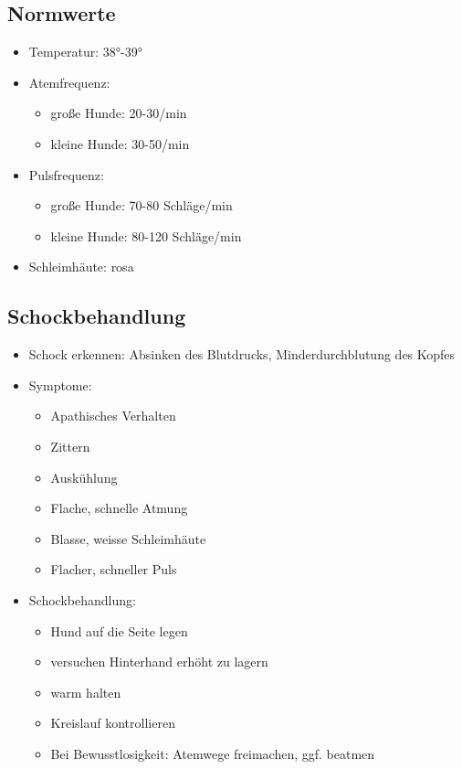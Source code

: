     \subsection{Normwerte}
    \begin{itemize}
        \item Temperatur: 38°-39°
        \item Atemfrequenz:
        \begin{itemize}
            \item große Hunde: 20-30/min
            \item kleine Hunde: 30-50/min
        \end{itemize}
        \item Pulsfrequenz:
        \begin{itemize}
            \item große Hunde: 70-80 Schläge/min
            \item kleine Hunde: 80-120 Schläge/min
        \end{itemize}
        \item Schleimhäute: rosa
    \end{itemize}

    \subsection{Schockbehandlung}
        \begin{itemize}
            \item Schock erkennen: Absinken des Blutdrucks, Minderdurchblutung des Kopfes
            \item Symptome:
            \begin{itemize}
                \item Apathisches Verhalten
                \item Zittern
                \item Auskühlung
                \item Flache, schnelle Atmung
                \item Blasse, weisse Schleimhäute
                \item Flacher, schneller Puls
            \end{itemize}
            \item Schockbehandlung:
            \begin{itemize}
                \item Hund auf die Seite legen
                \item versuchen Hinterhand erhöht zu lagern
                \item warm halten
                \item Kreislauf kontrollieren
                \item Bei Bewusstlosigkeit: Atemwege freimachen, ggf. beatmen
            \end{itemize}
        \end{itemize}


